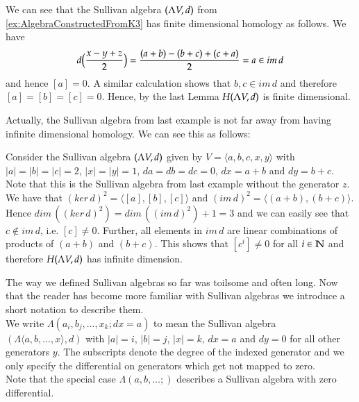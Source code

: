  \begin{Example}
 \label{ex:AlgebraConstructedFromK3HasFiniteHomology}
 We can see that the Sullivan algebra $(\Lambda V,d)$ from \ref{ex:AlgebraConstructedFromK3} has finite dimensional homology
 as follows. 
 We have 
 $$d \big{(} \frac{x - y + z}{2} \big{)} = \frac{(a + b) - (b + c) + (c + a)}{2} = a \in im \, d$$
 and hence $[a] = 0$. A similar calculation shows that $b,c \in im \, d$ and therefore
 $[a] = [b] = [c] = 0$. Hence, by the last Lemma $H (\Lambda V,d)$ is finite dimensional.
 \end{Example}

 Actually, the Sullivan algebra from last example is not far away from having infinite dimensional homology.
 We can see this as follows:
 
 \begin{Example}
 \label{ex:AlgebraFromK3WithoutOneEdge}
  Consider the Sullivan algebra $(\Lambda V,d)$ given by $V = \langle a,b,c , x,y \rangle$ with 
  $|a| = |b| = |c| = 2$, $|x| = |y| = 1$, $da = db = dc = 0$, $dx = a + b$ and $dy = b + c$.
  Note that this is the Sullivan algebra from last example without the generator $z$.
  We have that $(ker \, d)^2 = \langle [a], [b], [c] \rangle$ and 
  $(im \, d)^2 = \langle (a + b), (b +c) \rangle$. Hence $dim \, ( (ker \, d)^2 ) = dim \, ((im \, d)^2 )+ 1 = 3$ and 
  we can easily see that $c \notin im \,d$, i.e. $[c] \neq 0$. Further, all elements in $im \, d$ are 
  linear combinations of products of $( a + b)$ and $(b +c)$. This shows that $[c^i] \neq 0$ for all $i \in \mathbb{N}$
  and therefore $H (\Lambda V,d)$ has infinite dimension. 
 \end{Example}

\begin{Remark}
 The way we defined Sullivan algebras so far was toilsome and often long. Now that the reader has become more familiar
 with Sullivan algebras we introduce a short notation to describe them. \\
 We write $\Lambda (a_i , b_j, \ldots, x_k ; d x = a)$ to mean the Sullivan algebra
 $(\Lambda \langle a, b, \ldots, x \rangle , d) $ with $|a| = i$, $|b| = j$, $|x| = k$, $d x = a$ and
 $dy = 0 $ for all other generators $y$. The subscripts denote the degree of the indexed generator and
 we only specify the differential on generators which get not mapped to zero. \\
  Note that the special case $\Lambda(a,b, \ldots ;)$ describes a Sullivan algebra with zero differential.
\end{Remark}


